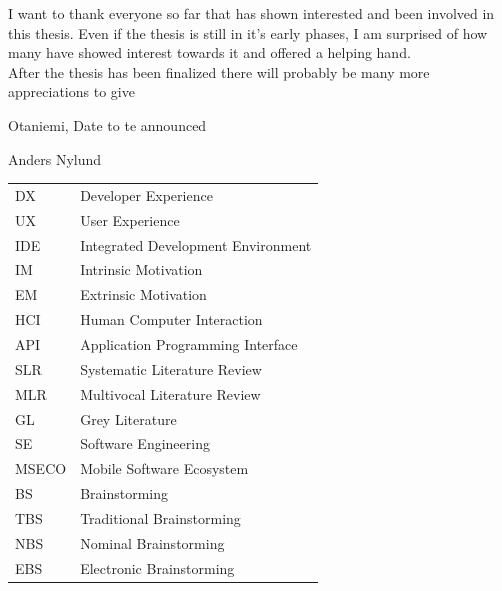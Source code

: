 \documentclass[english, 12pt, a4paper, sci, utf8, a-1b, online]{aaltothesis}
\begin{document}
I want to thank everyone so far that has shown interested and been involved in this thesis. Even if the thesis is still in it's early phases, I am surprised of how many have showed interest towards it and offered a helping hand.
\newline \\ After the thesis has been finalized there will probably be many more appreciations to give

\vspace{5cm}
Otaniemi, Date to te announced

\vspace{5mm}
{\hfill Anders Nylund \hspace{1cm}}

\newpage


\thesistableofcontents


\begin{tabular}{ll}
  DX    & Developer Experience               \\
  UX    & User Experience                    \\
  IDE   & Integrated Development Environment \\
  IM    & Intrinsic Motivation               \\
  EM    & Extrinsic Motivation               \\
  HCI   & Human Computer Interaction         \\
  API   & Application Programming Interface  \\
  SLR   & Systematic Literature Review       \\
  MLR   & Multivocal Literature Review       \\
  GL    & Grey Literature                    \\
  SE    & Software Engineering               \\
  MSECO & Mobile Software Ecosystem          \\
  BS    & Brainstorming                      \\
  TBS   & Traditional Brainstorming          \\
  NBS   & Nominal Brainstorming              \\
  EBS   & Electronic Brainstorming           \\
\end{tabular}
\end{document}
